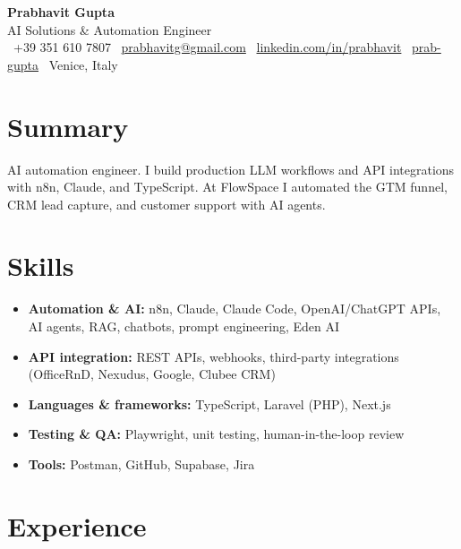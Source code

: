 \documentclass[a4paper,10pt]{article}
\begin{document}
\begin{center}
  {\Huge\bfseries Prabhavit Gupta}\\[3pt]
  {\color{accent}\large AI Solutions \& Automation Engineer}\\[5pt]
  \faPhone\ +39 351 610 7807 \quad
  \faEnvelope\ \href{mailto:prabhavitg@gmail.com}{prabhavitg@gmail.com} \quad
  \faLinkedin\ \href{https://www.linkedin.com/in/prabhavit/}{linkedin.com/in/prabhavit} \quad
  \faGithub\ \href{https://github.com/prab-gupta}{prab-gupta} \quad
  \faMapMarker*\ Venice, Italy
\end{center}

\section{Summary}
AI automation engineer. I build production LLM workflows and API integrations with n8n, Claude, and TypeScript. At FlowSpace I automated the GTM funnel, CRM lead capture, and customer support with AI agents.

\section{Skills}
\begin{itemize}
  \item \textbf{Automation \& AI:} n8n, Claude, Claude Code, OpenAI/ChatGPT APIs, AI agents, RAG, chatbots, prompt engineering, Eden AI
  \item \textbf{API integration:} REST APIs, webhooks, third-party integrations (OfficeRnD, Nexudus, Google, Clubee CRM)
  \item \textbf{Languages \& frameworks:} TypeScript, Laravel (PHP), Next.js
  \item \textbf{Testing \& QA:} Playwright, unit testing, human-in-the-loop review
  \item \textbf{Tools:} Postman, GitHub, Supabase, Jira
\end{itemize}

\section{Experience}
\end{document}
